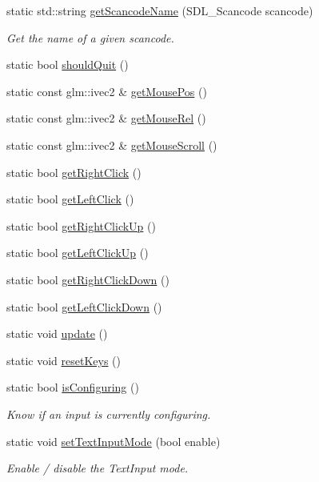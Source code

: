 \begin{DoxyCompactItemize}
static std\+::string \hyperlink{class_inputs_a496478c063e551845c3241e4006ffc08}{get\+Scancode\+Name} (S\+D\+L\+\_\+\+Scancode scancode)
\begin{DoxyCompactList}\small\item\em Get the name of a given scancode. \end{DoxyCompactList}\item 
static bool \hyperlink{class_inputs_a3844589a1c88f346f5daae1d2088748f}{should\+Quit} ()
\item 
static const glm\+::ivec2 \& \hyperlink{class_inputs_afc7227e1c5cd934309955f8db3c36097}{get\+Mouse\+Pos} ()
\item 
static const glm\+::ivec2 \& \hyperlink{class_inputs_abf9d434be64729115891ba206add1c68}{get\+Mouse\+Rel} ()
\item 
static const glm\+::ivec2 \& \hyperlink{class_inputs_ab73355bf19a30890703fea6dd27e00cf}{get\+Mouse\+Scroll} ()
\item 
static bool \hyperlink{class_inputs_ad559cf15f96bdb20abeb3bb27ec891f6}{get\+Right\+Click} ()
\item 
static bool \hyperlink{class_inputs_afb5c85d715cac7d16434a71030dc4cfa}{get\+Left\+Click} ()
\item 
static bool \hyperlink{class_inputs_a7e931413d84c57ab09b769b787fc60ec}{get\+Right\+Click\+Up} ()
\item 
static bool \hyperlink{class_inputs_a458bdc3d408476dfe439dc94047f292e}{get\+Left\+Click\+Up} ()
\item 
static bool \hyperlink{class_inputs_a0bafaac22e7dbfcf15229ba70388f8a9}{get\+Right\+Click\+Down} ()
\item 
static bool \hyperlink{class_inputs_aea7e7f3c2cc206616f4355cc6fba23e8}{get\+Left\+Click\+Down} ()
\item 
static void \hyperlink{class_inputs_a7765edb8008e1c3f7ea67e2aa77eb885}{update} ()
\item 
static void \hyperlink{class_inputs_aedb25df0e00a0b99b691a57746868393}{reset\+Keys} ()
\item 
static bool \hyperlink{class_inputs_a95f184338486ddfa3a59ff1d993d3e61}{is\+Configuring} ()
\begin{DoxyCompactList}\small\item\em Know if an input is currently configuring. \end{DoxyCompactList}\item 
static void \hyperlink{class_inputs_a154c7590c8ad9d4be127fcf5a0a392f1}{set\+Text\+Input\+Mode} (bool enable)
\begin{DoxyCompactList}\small\item\em Enable / disable the Text\+Input mode. \end{DoxyCompactList}\item 

\end{DoxyCompactItemize}
